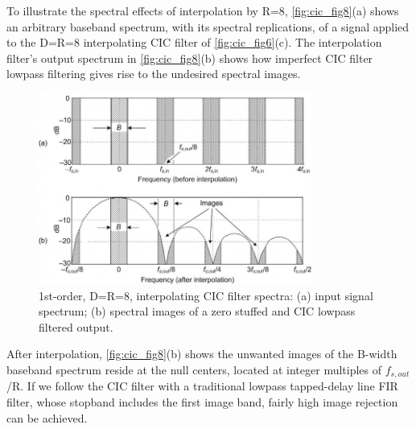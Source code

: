 To illustrate the spectral effects of interpolation by R=8, \autoref{fig:cic_fig8}(a) shows an arbitrary baseband spectrum, with its spectral replications, of a signal applied to the D=R=8 interpolating CIC filter of \autoref{fig:cic_fig6}(c). The interpolation filter's output spectrum in \autoref{fig:cic_fig8}(b) shows how imperfect CIC filter lowpass filtering gives rise to the undesired spectral images. 
\begin{figure}[ht]
    \centering
    \includegraphics[width=0.8\textwidth]{images/CIC_Filter/fig 8_16431.jpg}
    \caption{1st-order, D=R=8, interpolating CIC filter spectra: (a) input signal spectrum; (b) spectral images of a zero stuffed and CIC lowpass filtered output.}
    \label{fig:cic_fig8}
\end{figure}

After interpolation, \autoref{fig:cic_fig8}(b) shows the unwanted images of the B-width baseband spectrum reside at the null centers, located at integer multiples of $f_{s,out}$/R. If we follow the CIC filter with a traditional lowpass tapped-delay line FIR filter, whose stopband includes the first image band, fairly high image rejection can be achieved.

